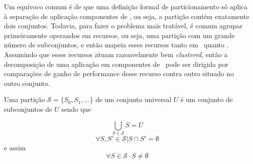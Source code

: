 		Um equívoco comum é de que uma definição formal de particionamento só aplica à separação de aplicação componentes de \hs, ou seja, a partição contém exatamente dois conjuntos. 
        Todavia, para fazer o problema mais tratável, é comum agrupar primeiramente operandos em recursos, ou seja, uma partição com um grande número de subconjuntos, e então mapeia esses recursos tanto em \hardware\ quanto \software. 
        Assumindo que esses recursos atuam razoavelmente bem \textit{clustered}, então a decomposição de uma aplicação em componentes de \hs\ pode ser dirigida por comparações de ganho de performance desse recurso contra outro situado no outro conjunto. 

		Uma partição $ \mathcal{S} = \{S_0, S_1, \dots\}$ de um conjunto universal $ U $ é um conjunto de subconjuntos de $ U $ sendo que

		\begin{equation}
			\bigcup_{S \in \mathcal{S}} S = U \label{eq:part_form_1}
		\end{equation}
		\begin{equation}
			\forall S, S' \in \mathcal{S} | S \cap S' = \emptyset \label{eq:part_form_2}
		\end{equation}
        e assim
		\begin{equation}
			\forall S \in \mathcal{S} \cdot S \neq \emptyset \label{eq:part_form_3}
		\end{equation}

